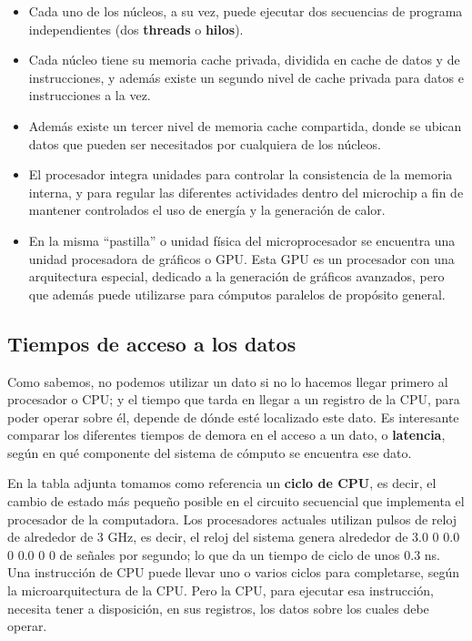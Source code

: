 \documentclass[spanish,A4,]{article}
\begin{document}
\begin{itemize}
\item
  Cada uno de los núcleos, a su vez, puede ejecutar dos secuencias de
  programa independientes (dos \textbf{threads} o \textbf{hilos}).
\item
  Cada núcleo tiene su memoria cache privada, dividida en cache de datos
  y de instrucciones, y además existe un segundo nivel de cache privada
  para datos e instrucciones a la vez.
\item
  Además existe un tercer nivel de memoria cache compartida, donde se
  ubican datos que pueden ser necesitados por cualquiera de los núcleos.
\item
  El procesador integra unidades para controlar la consistencia de la
  memoria interna, y para regular las diferentes actividades dentro del
  microchip a fin de mantener controlados el uso de energía y la
  generación de calor.
\item
  En la misma ``pastilla'' o unidad física del microprocesador se
  encuentra una unidad procesadora de gráficos o GPU. Esta GPU es un
  procesador con una arquitectura especial, dedicado a la generación de
  gráficos avanzados, pero que además puede utilizarse para cómputos
  paralelos de propósito general.
\end{itemize}

\subsection{Tiempos de acceso a los
datos}\label{tiempos-de-acceso-a-los-datos}

Como sabemos, no podemos utilizar un dato si no lo hacemos llegar
primero al procesador o CPU; y el tiempo que tarda en llegar a un
registro de la CPU, para poder operar sobre él, depende de dónde esté
localizado este dato. Es interesante comparar los diferentes tiempos de
demora en el acceso a un dato, o \textbf{latencia}, según en qué
componente del sistema de cómputo se encuentra ese dato.

En la tabla adjunta tomamos como referencia un \textbf{ciclo de CPU}, es
decir, el cambio de estado más pequeño posible en el circuito secuencial
que implementa el procesador de la computadora. Los procesadores
actuales utilizan pulsos de reloj de alrededor de 3 GHz, es decir, el
reloj del sistema genera alrededor de 3.0 0 0.0 0 0.0 0 0 de señales por
segundo; lo que da un tiempo de ciclo de unos 0.3 ns. Una instrucción de
CPU puede llevar uno o varios ciclos para completarse, según la
microarquitectura de la CPU. Pero la CPU, para ejecutar esa instrucción,
necesita tener a disposición, en sus registros, los datos sobre los
cuales debe operar.
\end{document}
